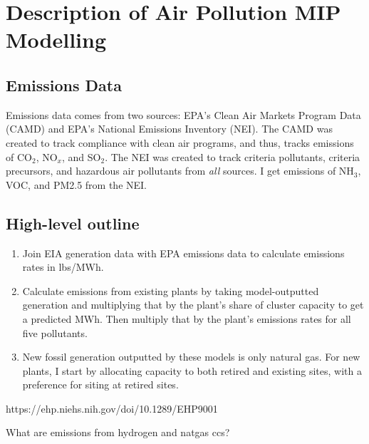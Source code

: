 \documentclass[a4paper]{article}
\theoremstyle{definition}
\theoremstyle{plain}
\begin{document}
\section{Description of Air Pollution MIP Modelling}

\subsection{Emissions Data}
Emissions data comes from two sources: EPA's Clean Air Markets Program Data (CAMD) and EPA's National Emissions Inventory (NEI).  The CAMD was created to track compliance with clean air programs, and thus, tracks emissions of CO$_2$, NO$_x$, and SO$_2$.  The NEI was created to track criteria pollutants, criteria precursors, and hazardous air pollutants from \textit{all} sources.  I get emissions of NH$_3$, VOC, and PM2.5 from the NEI. 

\subsection{High-level outline}
\begin{enumerate}
    \item Join EIA generation data with EPA emissions data to calculate emissions rates in lbs/MWh.
    \item Calculate emissions from existing plants by taking model-outputted generation and multiplying that by the plant's share of cluster capacity to get a predicted MWh.  Then multiply that by the plant's emissions rates for all five pollutants.
    \item New fossil generation outputted by these models is only natural gas.  For new plants, I start by allocating capacity to both retired and existing sites, with a preference for siting at retired sites.
\end{enumerate}

https://ehp.niehs.nih.gov/doi/10.1289/EHP9001

What are emissions from hydrogen and natgas ccs?

\begin{singlespace}
\newpage

%

\end{singlespace}
\end{document}
